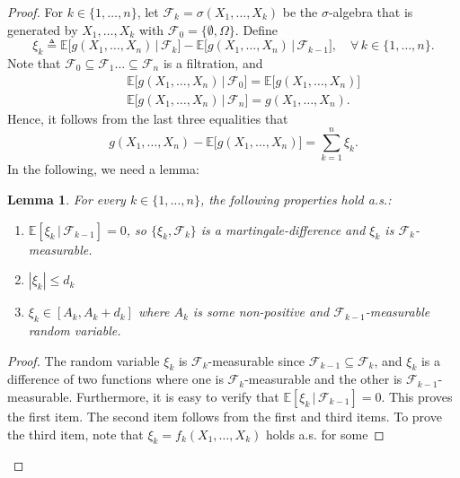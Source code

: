 \documentclass[12pt, oneside, a4paper]{article}
\theoremstyle{plain}
\newtheorem{lem}[thm]{Lemma}
\theoremstyle{definition}
\def\expectation{\ensuremath{\mathbb{E}}}
\begin{document}
\begin{proof}
For $k \in \{1, \ldots, n\}$, let
$\mathcal{F}_k = \sigma(X_1, \ldots, X_k)$ be the $\sigma$-algebra that is generated
by $X_1, \ldots, X_k$ with $\mathcal{F}_0 = \{\emptyset, \Omega\}$. Define
\begin{equation}
\xi_k \triangleq \expectation \bigl[ g(X_1, \ldots, X_n) \, | \, \mathcal{F}_k \bigr]
- \expectation \bigl[ g(X_1, \ldots, X_n) \, | \, \mathcal{F}_{k-1} \bigr], \quad
\forall \, k \in \{1, \ldots, n\}.
\label{eq: martingale difference}
\end{equation}
Note that $\mathcal{F}_0 \subseteq \mathcal{F}_1 \ldots \subseteq \mathcal{F}_n$
is a filtration, and
\begin{eqnarray}
&& \expectation \bigl[ g(X_1, \ldots, X_n) \, | \, \mathcal{F}_0 \bigr] =
\expectation \bigl[ g(X_1, \ldots, X_n) \bigr] \nonumber \\
&& \expectation \bigl[ g(X_1, \ldots, X_n) \, | \, \mathcal{F}_n \bigr] =
g(X_1, \ldots, X_n).
\end{eqnarray}
Hence, it follows from the last three equalities that
\begin{equation*}
g(X_1, \ldots, X_n) - \expectation \bigl[ g(X_1, \ldots, X_n) \bigr] = \sum_{k=1}^n \xi_k.
\end{equation*}
In the following, we need a lemma:
\begin{lem}
For every $k \in \{1, \ldots, n\}$, the following properties hold a.s.:
\begin{enumerate}
\item $\expectation[\xi_k \, | \, \mathcal{F}_{k-1}] = 0$, so $\{\xi_k, \mathcal{F}_k\}$
is a martingale-difference and $\xi_k$ is $\mathcal{F}_k$-measurable.
\item $|\xi_k| \leq d_k$
\item $\xi_k \in [A_k, A_k + d_k]$ where $A_k$ is some non-positive and
$\mathcal{F}_{k-1}$-measurable random variable.
\end{enumerate}
\end{lem}
\begin{proof}
The random variable $\xi_k$ is $\mathcal{F}_k$-measurable since
$\mathcal{F}_{k-1} \subseteq \mathcal{F}_k$, and $\xi_k$ is a difference
of two functions where one is $\mathcal{F}_k$-measurable and the other
is $\mathcal{F}_{k-1}$-measurable. Furthermore, it is easy to verify that
$\expectation[\xi_k \, | \, \mathcal{F}_{k-1}] = 0.$ This proves the first item.
The second item follows from the first and third items. To prove the third item,
note that $\xi_k = f_k(X_1, \ldots, X_k)$ holds a.s. for some

\end{proof}
\end{proof}
\end{document}
